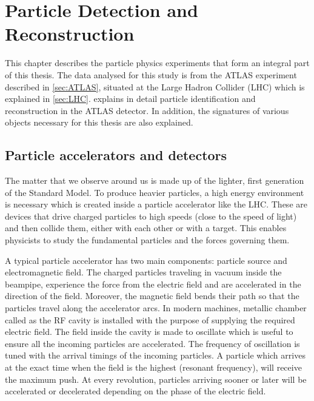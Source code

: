 
\chapter{Particle Detection and Reconstruction}
\label{sec:LHCATLAS}

This chapter describes the particle physics experiments that form an integral part of this thesis.
The data analysed for this study is from the ATLAS experiment described in \cref{sec:ATLAS}, situated
at the Large Hadron Collider (LHC) which is explained in \cref{sec:LHC}.  
explains in detail particle identification and reconstruction in the ATLAS detector. In addition, the 
signatures of various objects necessary for this thesis are also explained.  

\section{Particle accelerators and detectors}
The matter that we observe around us is made up of the lighter, first generation of the Standard Model.
To produce heavier particles, a high energy environment is necessary which is 
created inside a particle accelerator like the LHC. These are devices that drive charged particles to 
high speeds (close to the speed of light) and then collide them, either with each other or with a target. 
This enables physicists to study the fundamental particles and the forces governing them.

A typical particle accelerator has two main components: particle source and electromagnetic field. The 
charged particles traveling in vacuum inside the beampipe, experience the force from the electric field and are accelerated in the direction of 
the field. Moreover, the magnetic field bends their path so that the particles travel along the 
accelerator arcs. In modern machines, metallic chamber called as the RF cavity is installed with the purpose of
supplying the required electric field. The field inside the cavity is made to oscillate which is useful
to ensure all the incoming particles are accelerated. The frequency of oscillation is tuned with the
arrival timings of the incoming particles. A particle which arrives at the exact time when the field
is the highest (resonant frequency), will receive the maximum push. At every revolution, particles
arriving sooner or later will be accelerated or decelerated depending on the phase of the electric 
field. 

